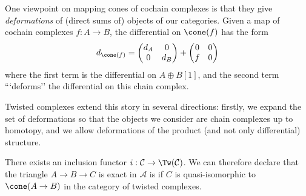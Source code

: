 

One viewpoint on mapping cones of cochain  complexes is that they give \emph{deformations} of (direct sums of) objects of our categories. Given a map of cochain complexes $f: A\to B$, the differential on $\cone(f)$ has the form 
\[d_{\cone(f)}=\begin{pmatrix} d_A & 0 \\ 0 & d_B \end{pmatrix} + \begin{pmatrix} 0 & 0\\ f & 0\end{pmatrix}\]
where the first term is the differential on $A\oplus B[1]$, and the second term ```deforms'' the differential on this chain complex.

Twisted complexes  extend this story in several directions: firstly, we expand the set of deformations so that the objects we consider are chain complexes up to homotopy, and we allow deformations of the product (and not only differential) structure.









There exists an inclusion functor $i:\mathcal C\to \Tw(\mathcal C)$.
We can therefore declare that the triangle $A\to B\to C$ is exact in  $\mathcal A$ is if $C$ is quasi-isomorphic to $\cone(A\to B)$ in the category of twisted complexes. 

